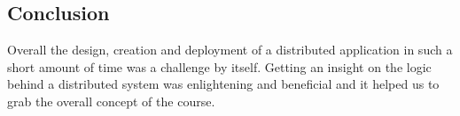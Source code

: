 \subsection{Conclusion}
\label{conc}

Overall the design, creation and deployment of a distributed application in such a short amount of time was a challenge by itself. Getting an insight on the logic behind a distributed system was enlightening and beneficial and it helped us to grab the overall concept of the course.\\ 